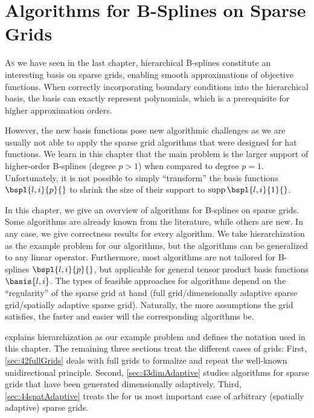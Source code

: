 
\chapter{Algorithms for B-Splines on Sparse Grids}



\lettrine{A}{s} we have seen in the last chapter,
hierarchical B-splines constitute an interesting basis on sparse grids,
enabling smooth approximations of objective functions.
When correctly incorporating boundary conditions into the hierarchical basis,
the basis can exactly represent polynomials,
which is a prerequisite for higher approximation orders.

However, the new basis functions pose new algorithmic challenges
as we are usually not able to apply the sparse grid algorithms
that were designed for hat functions.
We learn in this chapter that the main problem is the larger support
of higher-order B-splines (degree $p > 1$) when compared to degree $p = 1$.
Unfortunately, it is not possible to simply ``transform'' the basis
functions $\bspl{l,i}{p}{}$ to shrink the size of their support
to $\supp \bspl{l,i}{1}{}$.

In this chapter, we give an overview of algorithms for B-splines
on sparse grids.
Some algorithms are already known from the literature,
while others are new.
In any case, we give correctness results for every algorithm.
We take hierarchization as the example problem for our algorithms,
but the algorithms can be generalized to any linear operator.
Furthermore, most algorithms are not tailored for B-splines $\bspl{l,i}{p}{}$,
but applicable for general tensor product basis functions $\basis{l,i}$.
The types of feasible approaches for algorithms
depend on the ``regularity'' of the sparse grid at hand
(full grid/dimensionally adaptive sparse grid/spatially adaptive sparse grid).
Naturally, the more assumptions the grid satisfies, the faster and
easier will the corresponding algorithms be.

 explains hierarchization as our example problem
and defines the notation used in this chapter.
The remaining three sections treat the different cases of grids:
First, \cref{sec:42fullGrids} deals with full grids to formalize and repeat
the well-known unidirectional principle.
Second, \cref{sec:43dimAdaptive} studies algorithms for
sparse grids that have been generated dimensionally adaptively.
Third, \cref{sec:44spatAdaptive} treats the for us most important case
of arbitrary (spatially adaptive) sparse grids.


